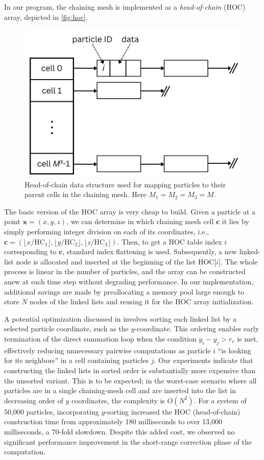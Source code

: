In our program, the chaining mesh is implemented as a \textit{head-of-chain} (HOC) array, depicted in \autoref{fig:hoc}.
\begin{figure}[htp]
    \centering
    \includegraphics[scale=0.25]{chapters/p3m-method/img/hoc.png}
    \caption{Head-of-chain data structure used for mapping particles to their parent cells in the chaining mesh.
        Here $M_1=M_2=M_3 = M$.}
    \label{fig:hoc}
\end{figure}
The basic version of the HOC array is very cheap to build.
Given a particle at a point $\mathbf{x} = (x, y, z)$, we can determine in which chaining mesh cell $\mathbf{c}$ it lies by simply performing integer division on each of its coordinates, i.e., $\mathbf{c} = (\lfloor x / \text{HC}_1 \rfloor, \lfloor y / \text{HC}_2 \rfloor, \lfloor z / \text{HC}_3 \rfloor)$.
Then, to get a HOC table index $i$ corresponding to $\mathbf{c}$, standard index flattening is used.
Subsequently, a new linked-list node is allocated and inserted at the beginning of the list HOC[$i$].
The whole process is linear in the number of particles, and the array can be constructed anew at each time step without degrading performance.
In our implementation, additional savings are made by preallocating a memory pool large enough to store $N$ nodes of the linked lists and reusing it for the HOC array initialization.

A potential optimization discussed in \cite{Hockney1988} involves sorting each linked list by a selected particle coordinate, such as the $y$-coordinate.
This ordering enables early termination of the direct summation loop when the condition $y_i - y_j > r_e$ is met, effectively reducing unnecessary pairwise computations as particle $i$ ``is looking for its neighbors'' in a cell containing particles $j$.
Our experiments indicate that constructing the linked lists in sorted order is substantially more expensive than the unsorted variant.
This is to be expected; in the worst-case scenario where all particles are in a single chaining-mesh cell and are inserted into the list in decreasing order of $y$ coordinates, the complexity is $O(N^2)$.
For a system of 50{,}000 particles, incorporating $y$-sorting increased the HOC (head-of-chain) construction time from approximately 180 milliseconds to over 13{,}000 milliseconds, a 70-fold slowdown.
Despite this added cost, we observed no significant performance improvement in the short-range correction phase of the computation.
